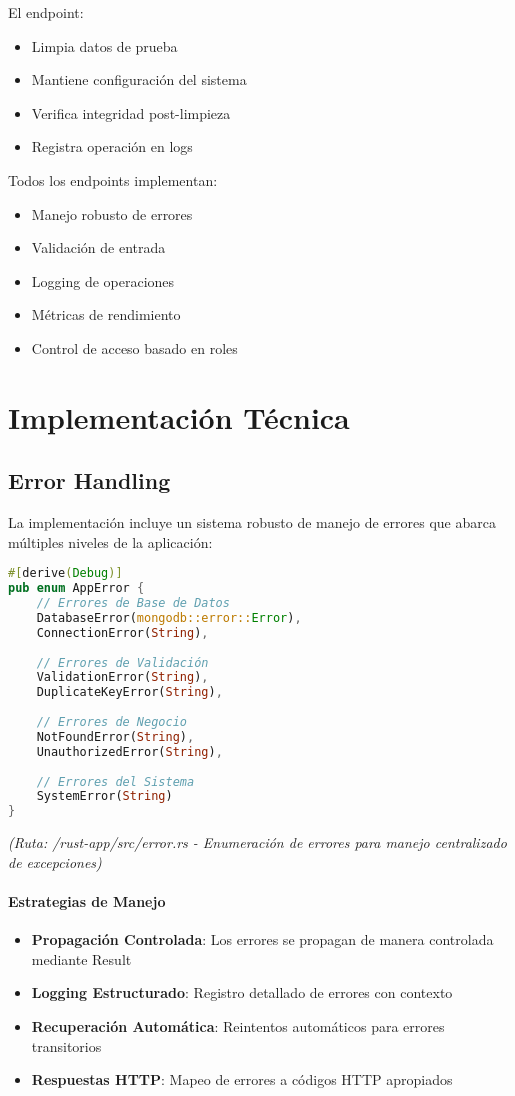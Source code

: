 \documentclass[12pt,letterpaper]{article}
\begin{document}
El endpoint:
\begin{itemize}
    \item Limpia datos de prueba
    \item Mantiene configuración del sistema
    \item Verifica integridad post-limpieza
    \item Registra operación en logs
\end{itemize}

Todos los endpoints implementan:
\begin{itemize}
    \item Manejo robusto de errores
    \item Validación de entrada
    \item Logging de operaciones
    \item Métricas de rendimiento
    \item Control de acceso basado en roles
\end{itemize}
\section{Implementación Técnica}
\subsection{Error Handling}
La implementación incluye un sistema robusto de manejo de errores que abarca múltiples niveles de la aplicación:

\begin{lstlisting}[language=rust]
#[derive(Debug)]
pub enum AppError {
    // Errores de Base de Datos
    DatabaseError(mongodb::error::Error),
    ConnectionError(String),
    
    // Errores de Validación
    ValidationError(String),
    DuplicateKeyError(String),
    
    // Errores de Negocio
    NotFoundError(String),
    UnauthorizedError(String),
    
    // Errores del Sistema
    SystemError(String)
}
\end{lstlisting}
\textit{(Ruta: /rust-app/src/error.rs - Enumeración de errores para manejo centralizado de excepciones)}

\paragraph{Estrategias de Manejo}
\begin{itemize}
    \item \textbf{Propagación Controlada}: Los errores se propagan de manera controlada mediante Result
    \item \textbf{Logging Estructurado}: Registro detallado de errores con contexto
    \item \textbf{Recuperación Automática}: Reintentos automáticos para errores transitorios
    \item \textbf{Respuestas HTTP}: Mapeo de errores a códigos HTTP apropiados
\end{itemize}
\end{document}
